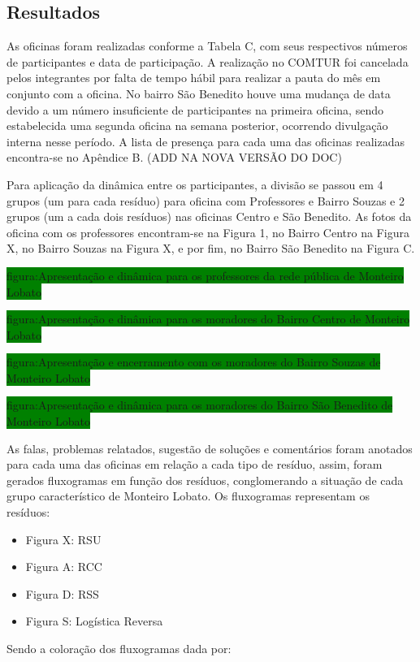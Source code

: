 	\subsection{Resultados}
	As oficinas foram realizadas conforme a Tabela C, com seus respectivos números de participantes e data de participação. A realização no COMTUR foi cancelada pelos integrantes por falta de tempo hábil para realizar a pauta do mês em conjunto com a oficina. No bairro São Benedito houve uma mudança de data devido a um número insuficiente de participantes na primeira oficina, sendo estabelecida uma segunda oficina na semana posterior, ocorrendo divulgação interna nesse período. A lista de presença para cada uma das oficinas realizadas encontra-se no Apêndice B. (ADD NA NOVA VERSÃO DO DOC)
	
	Para aplicação da dinâmica entre os participantes, a divisão se passou em 4 grupos (um para cada resíduo) para oficina com Professores e Bairro Souzas e 2 grupos (um a cada dois resíduos) nas oficinas Centro e São Benedito. As fotos da oficina com os professores encontram-se na Figura 1, no Bairro Centro na Figura X, no Bairro Souzas na Figura X, e por fim, no Bairro São Benedito na Figura C.
	
	\colorbox{green}{figura:Apresentação e dinâmica para os professores da rede pública de Monteiro Lobato}
	
	\colorbox{green}{figura:Apresentação e dinâmica para os moradores do Bairro Centro de Monteiro Lobato}
	
	\colorbox{green}{figura:Apresentação e encerramento com os moradores do Bairro Souzas de Monteiro Lobato}
	
	\colorbox{green}{figura:Apresentação e dinâmica para os moradores do Bairro São Benedito de Monteiro Lobato}
	
	As falas, problemas relatados, sugestão de soluções e comentários foram anotados para cada uma das oficinas em relação a cada tipo de resíduo, assim, foram gerados fluxogramas em função dos resíduos, conglomerando a situação de cada grupo característico de Monteiro Lobato. Os fluxogramas representam os resíduos:
	\begin{itemize}
	\item Figura X: RSU
	\item Figura A: RCC
	\item Figura D: RSS
	\item Figura S: Logística Reversa 
	\end{itemize}
	
	Sendo a coloração dos fluxogramas dada por:
	
